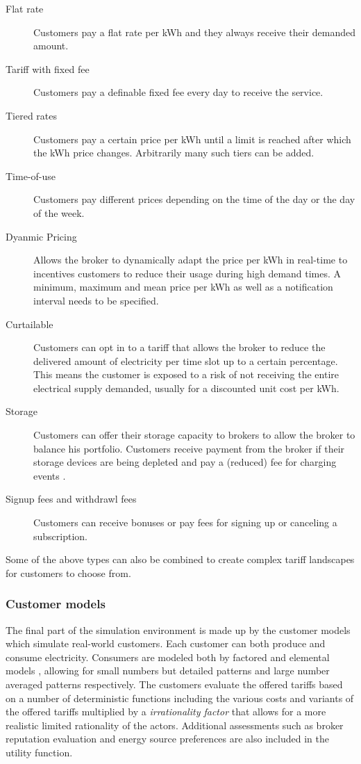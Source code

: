 \begin{description}
    \item[Flat rate] Customers pay a flat rate per kWh and they always receive their demanded
        amount.
    \item[Tariff with fixed fee] Customers pay a definable fixed fee every day to receive the service.
    \item [Tiered rates] Customers pay a certain price per kWh until a limit is reached after which the kWh price
        changes.  Arbitrarily many such tiers can be added.  \item[Time-of-use] Customers pay different prices depending
        on the time of the day or the day of the week.  \item[Dyanmic Pricing] Allows the broker to dynamically adapt
        the price per kWh in real-time to incentives customers to reduce their usage during high demand times. A
        minimum, maximum and mean price per kWh as well as a notification interval needs to be specified.
    \item[Curtailable] Customers can opt in to a tariff that allows the broker to reduce the delivered amount of
        electricity per time slot up to a certain percentage. This means the customer is exposed to a risk of not
        receiving the entire electrical supply demanded, usually for a discounted unit cost per kWh.  \item[Storage]
        Customers can offer their storage capacity to brokers to allow the broker to balance his portfolio. Customers
        receive payment from the broker if their storage devices are being depleted and pay a (reduced) fee for charging
        events \citep[p.9]{ketter2018powertac}.
    \item[Signup fees and withdrawl fees] Customers can receive bonuses or pay fees
        for signing up or canceling a subscription.
\end{description}

Some of the above types can also be combined to create complex tariff landscapes for customers to choose from.

\subsubsection{Customer models}%

The final part of the simulation environment is made up by the customer models which simulate real-world customers.
Each customer can both produce and consume electricity. Consumers are modeled both by factored and elemental models
\citep[p.14]{ketter2018powertac}, allowing for small numbers but detailed patterns and large number averaged
patterns respectively. The customers evaluate the offered tariffs based on a number of deterministic functions
including the various costs and variants of the offered tariffs multiplied by a \emph{irrationality factor} that
allows for a more realistic limited rationality of the actors. Additional assessments such as broker reputation
evaluation and energy source preferences are also included in the utility function.

